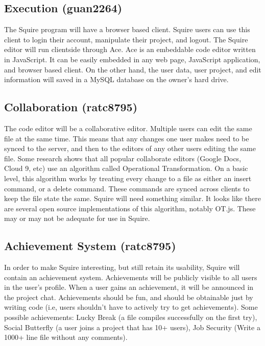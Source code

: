 \documentclass[11pt]{report}
\begin{document}
\begin{IDE-like Features}
\begin{}
\begin{Collaborative features that would be "nice":}
\subsection{Execution (guan2264)}
The Squire program will have a browser based client. Squire users can use this client to login their account, manipulate their project, and logout. The Squire editor will run clientside through Ace. Ace is an embeddable code editor written in JavaScript. It can be easily embedded in any web page, JavaScript application, and browser based client. On the other hand, the user data, user project, and edit information will saved in a MySQL database on the owner's hard drive.  

\subsection{Collaboration (ratc8795)}
The code editor will be a collaborative editor. Multiple users can edit the same file at the same time. This means that any changes one user makes need to be synced to the server, and then to the editors of any other users editing the same file. Some research shows that all popular collaborate editors (Google Docs, Cloud 9, etc) use an algorithm called Operational Transformation. On a basic level, this algorithm works by treating every change to a file as either an insert command, or a delete command. These commands are synced across clients to keep the file state the same. Squire will need something similar. It looks like there are several open source implementations of this algorithm, notably OT.js. These may or may not be adequate for use in Squire.
 
\subsection{Achievement System (ratc8795)}
In order to make Squire interesting, but still retain its usability, Squire will contain an achievement system. Achievements will be publicly visible to all users in the user's profile. When a user gains an achievement, it will be announced in the project chat. Achievements should be fun, and should be obtainable just by writing code (i.e, users shouldn’t have to actively try to get achievements). Some possible achievements: Lucky Break (a file compiles successfully on the first try), Social Butterfly (a user joins a project that has 10+ users), Job Security (Write a 1000+ line file without any comments).


\end{Collaborative features that would be "nice":}
\end{}
\end{IDE-like Features}
\end{document}
